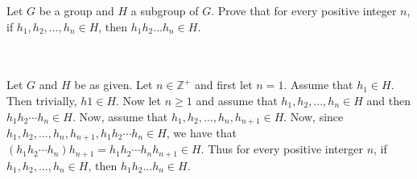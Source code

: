 Let $G$ be a group and $H$ a subgroup of $G$. Prove that for every positive integer $n$, if
$h_1, h_2,...,h_n\in H$, then $h_1h_2...h_n\in H$.\\\\

\begin{solution}\renewcommand{\qedsymbol}{}\ \\
    Let $G$ and $H$ be as given. Let $n\in\mathbb{Z}^+$ and first let $n=1$. Assume that $h_1\in H$.
    Then trivially, $h1\in H$. Now let $n\geq1$ and assume that $h_1,h_2,...,h_n\in H$ and then
    $h_1h_2\cdots h_n\in H$. Now, assume that $h_1,h_2,...,h_n,h_{n+1}\in H$. Now, since
    $h_1,h_2,...,h_n,h_{n+1},h_1h_2\cdots h_n\in H$, we have that
    $(h_1h_2\cdots h_n)h_{n+1}=h_1h_2\cdots h_nh_{n+1}\in H$. Thus for every positive interger $n$, if
    $h_1, h_2,...,h_n\in H$, then $h_1h_2...h_n\in H$.

\end{solution}